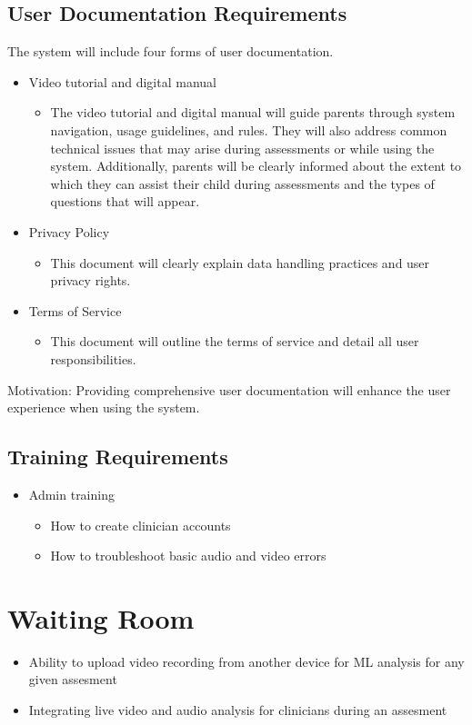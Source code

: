 \documentclass[12pt]{article}
\begin{document}
\subsection{User Documentation Requirements}
\hspace{2em}The system will include four forms of user documentation. 
\begin{itemize}
  \item Video tutorial and digital manual
  \begin{itemize}
    \item The video tutorial and digital manual will guide parents through system navigation, usage guidelines, 
    and rules. They will also address common technical issues that may arise during assessments or 
    while using the system. Additionally, parents will be clearly informed about the extent to 
    which they can assist their child during assessments and the types of questions that will appear.
  \end{itemize}
  \item Privacy Policy
  \begin{itemize}
    \item This document will clearly explain data handling practices and user privacy rights.
  \end{itemize}
  \item Terms of Service
  \begin{itemize}
    \item This document will outline the terms of service and detail all user responsibilities.
  \end{itemize}
\end{itemize}

Motivation: Providing comprehensive user documentation will enhance the user experience when using the system.

\subsection{Training Requirements}
\begin{itemize}
  \item Admin training
  \begin{itemize}
    \item How to create clinician accounts
    \item How to troubleshoot basic audio and video errors
  \end{itemize}
\end{itemize}
\section{Waiting Room}
\begin{itemize}
  \item Ability to upload video recording from another device for ML analysis for any given assesment
  \item Integrating live video and audio analysis for clinicians during an assesment
\end{itemize}
\end{document}
